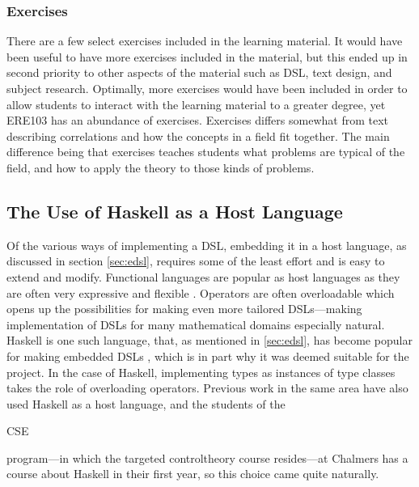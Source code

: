 


\subsubsection{Exercises}
There are a few select exercises included in the learning material. It would have been useful to have more exercises included in the material, but this ended up in second priority to other aspects of the material such as \gls{DSL}, text design, and subject research. Optimally, more exercises would have been included in order to allow students to interact with the learning material to a greater degree, yet \gls{ERE103} has an abundance of exercises. Exercises differs somewhat from text describing correlations and how the concepts in a field fit together. The main difference being that exercises teaches students what problems are typical of the field, and how to apply the theory to those kinds of problems. 


\subsection{The Use of Haskell as a Host Language}\label{sec:useofhaskell}

Of the various ways of implementing a \gls{DSL}, embedding it in a host language, as discussed in section \ref{sec:edsl}, requires some of the least effort and is easy to extend and modify. Functional languages are popular as host languages as they are often very expressive and flexible \cite{techniquesforedsls}. Operators are often overloadable which opens up the possibilities for making even more tailored \gls{DSL}s---making implementation of \gls{DSL}s for many mathematical domains especially natural. \gls{Haskell} is one such language, that, as mentioned in \ref{sec:edsl}, has become popular for making embedded \gls{DSL}s \cite{techniquesforedsls}, which is in part why it was deemed suitable for the project. In the case of \gls{Haskell}, implementing types as instances of type classes takes the role of overloading operators. 
Previous work in the same area \cite{tssarbete,fysikarbete,Ionescu_2016} have also used \gls{Haskell} as a host language, and the students of the \begin{modtext}CSE \end{modtext} program---in which the targeted \gls{controltheory} course resides---at Chalmers has a course about \gls{Haskell} in their first year, so this choice came quite naturally.

